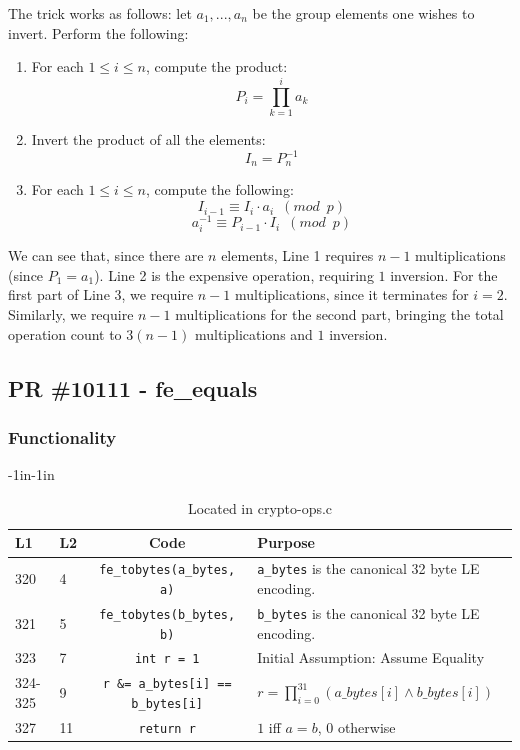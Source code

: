 \documentclass[12pt,titlepage,table]{article}
\begin{document}
\medskip
The trick works as follows: let $a_1,...,a_n$ be the group elements one wishes to invert. Perform the following:
\begin{enumerate}
\item For each $1 \leq i \leq n$, compute the product:
$$P_i = \prod_{k = 1}^i a_k$$
\item Invert the product of all the elements:
$$I_n = P_n^{-1}$$
\item For each $1 \leq i \leq n$, compute the following:
$$I_{i - 1} \equiv I_i \cdot a_i \, \, \, (mod \, \, \, p)$$
$$a_i^{-1} \equiv P_{i - 1} \cdot I_i \, \, \, (mod \, \, \, p)$$
\end{enumerate} 

\medskip
We can see that, since there are $n$ elements, Line 1 requires $n-1$ multiplications (since $P_1 = a_1$). Line 2 is the expensive operation, requiring $1$ inversion. For the first part of Line 3, we require $n-1$ multiplications, since it terminates for $i = 2$. Similarly, we require $n - 1$ multiplications for the second part, bringing the total operation count to $3(n-1)$ multiplications and $1$ inversion.

\newpage
\subsection{PR \#10111 - fe\_equals}
\subsubsection{Functionality}


\begin{table}[htbp]
\caption{fe\_equals Source To Spec Map}
\begin{adjustwidth}{-1in}{-1in}
\centering
{
\begin{tabular}{| l | l | c | l |}
\hline
\textbf{L1} & \textbf{L2} & \textbf{Code} & \textbf{Purpose} \\
\hline
\hline
320 & 4 &\verb+fe_tobytes(a_bytes, a)+ & \verb+a_bytes+ is the canonical 32 byte LE encoding. \\
321 & 5 &\verb+fe_tobytes(b_bytes, b)+ &  \verb+b_bytes+ is the canonical 32 byte LE encoding. \\
323 & 7 &\verb|int r = 1| & Initial Assumption: Assume Equality \\
324-325 & 9 & \verb|r &= a_bytes[i] == b_bytes[i]| & $r = \prod\limits_{i = 0}^{31} (a\_bytes[i] \land b\_bytes[i] )$ \\
327 & 11 &\verb|return r| & $1$ iff $a=b$, $0$ otherwise \\
\hline
\end{tabular}}
\end{adjustwidth}
\caption*{Located in crypto-ops.c}
\end{table}
\end{document}
